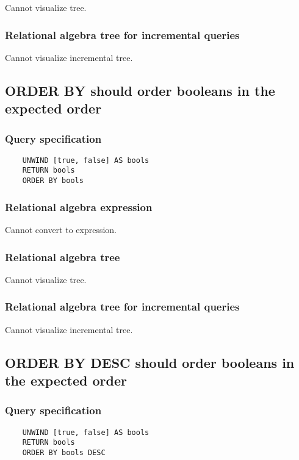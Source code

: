 	Cannot visualize tree.

	\subsubsection*{Relational algebra tree for incremental queries}

	Cannot visualize incremental tree.
	\subsection{ORDER BY should order booleans in the expected order}

	\subsubsection*{Query specification}

	\begin{lstlisting}
	UNWIND [true, false] AS bools
	RETURN bools
	ORDER BY bools
	\end{lstlisting}


	\subsubsection*{Relational algebra expression}

	Cannot convert to expression.

	\subsubsection*{Relational algebra tree}

	Cannot visualize tree.

	\subsubsection*{Relational algebra tree for incremental queries}

	Cannot visualize incremental tree.
	\subsection{ORDER BY DESC should order booleans in the expected order}

	\subsubsection*{Query specification}

	\begin{lstlisting}
	UNWIND [true, false] AS bools
	RETURN bools
	ORDER BY bools DESC
	\end{lstlisting}



